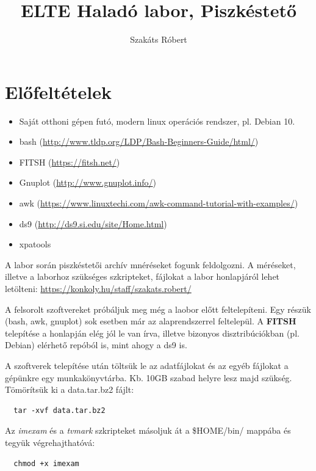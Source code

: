 \documentclass{article}
\begin{document}
\title{ELTE Haladó labor, Piszkéstető}
\author{Szakáts Róbert}

\maketitle
\tableofcontents
\newpage

\section{Előfeltételek}

\begin{itemize}
  \item Saját otthoni gépen futó, modern linux operációs rendszer, pl. Debian 10.
  \item bash (\url{http://www.tldp.org/LDP/Bash-Beginners-Guide/html/})
  \item FITSH (\url{https://fitsh.net/})
  \item Gnuplot (\url{http://www.gnuplot.info/})
  \item awk (\url{https://www.linuxtechi.com/awk-command-tutorial-with-examples/})
  \item ds9 (\url{http://ds9.si.edu/site/Home.html})
  \item xpatools
\end{itemize}

A labor során piszkéstetői archív mnéréseket fogunk feldolgozni. A méréseket,
illetve a laborhoz szükséges szkripteket, fájlokat a labor honlapjáról lehet
letölteni:
\url{https://konkoly.hu/staff/szakats.robert/}

A felsorolt szoftvereket próbáljuk meg még a laobor előtt feltelepíteni.
Egy részük (bash, awk, gnuplot) sok esetben már az alaprendszerrel feltelepül.
A {\bf{FITSH}} telepítése a honlapján elég jól le van írva, illetve bizonyos
disztribúciókban (pl. Debian) elérhető repóból is, mint ahogy a ds9 is.

A szoftverek telepítése után töltsük le az adatfájlokat és az egyéb fájlokat a
gépünkre egy munkakönyvtárba. Kb. 10GB szabad helyre lesz majd szükség.
Tömörítsük ki a data.tar.bz2 fájlt:
\begin{verbatim}
  tar -xvf data.tar.bz2
\end{verbatim}


Az {\it imexam} és a {\it tvmark} szkripteket másoljuk át a \$HOME/bin/ mappába
és tegyük végrehajthatóvá:
\begin{verbatim}
  chmod +x imexam
\end{verbatim}
\end{document}

